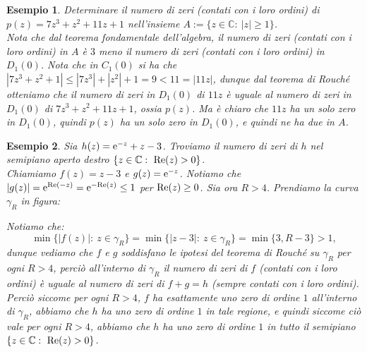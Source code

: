 \documentclass[11pt]{book}
\theoremstyle{Definizione}
\theoremstyle{TeoremaProposizioneLemmaCorollarioCongettura}
\theoremstyle{OsservazioneNotaEsempio}
\newtheorem{myes}{Esempio}[section]
\newcommand{\R}{\mathbb{R}}
\newcommand{\C}{\mathbb{C}}
\newcommand{\Disc}[3][]{D^{#1}_{{#2}}({#3})}
\renewcommand{\Re}{\textup{Re}}
\renewcommand{\i}{\textup{i}}
\newcommand{\e}{\textup{e}}
\newcommand{\frecciaIn}{
\tikz \draw[-latex] (-1pt,0) -- (1pt,0);
}
\newcommand{\frecciaOut}{
\tikz \draw[latex-] (-1pt,0) -- (1pt,0);
}
\begin{document}
\begin{myes}
Determinare il numero di zeri (contati con i loro ordini) di $p(z) = 7z^3+z^2+11z+1$ nell'insieme $A:=\{z\in \C:\ |z|\geq 1\}$.\\
Nota che dal teorema fondamentale dell'algebra, il numero di zeri (contati con i loro ordini) in $A$ è $3$ meno il numero di zeri (contati con i loro ordini) in $\Disc{1}{0}$. Nota che in $C_1(0)$ si ha che $|7z^3+z^2+1| \leq |7z^3|+|z^2|+1 = 9 < 11 = |11z|$, dunque dal teorema di Rouché otteniamo che il numero di zeri in $\Disc{1}{0}$ di $11z$ è uguale al numero di zeri in $\Disc{1}{0}$ di $7z^3+z^2+11z+1$, ossia $p(z)$. Ma è chiaro che $11z$ ha un solo zero in $\Disc{1}{0}$, quindi $p(z)$ ha un solo zero in $\Disc{1}{0}$, e quindi ne ha due in $A$.
\end{myes}
\begin{myes}
Sia $h(z) = \e^{-z}+z-3$. Troviamo il numero di zeri di $h$ nel semipiano aperto destro $\{z\in \C:\ \Re(z) > 0\}$.\\
Chiamiamo $f(z) = z-3$ e $g(z) = \e^{-z}$. Notiamo che $|g(z)| = \e^{\Re(-z)} = \e^{-\Re(z)} \leq 1$ per $\Re(z) \geq 0$. Sia ora $R > 4$. Prendiamo la curva $\gamma_R$ in figura:
\begin{center}
\end{center}
Notiamo che:
$$
\min\{|f(z)|:\ z\in \gamma_R\} = \min\{|z-3|:\ z\in \gamma_R\} = \min\{3,R-3\} > 1,
$$
dunque vediamo che $f$ e $g$ soddisfano le ipotesi del teorema di Rouché su $\gamma_R$ per ogni $R > 4$, perciò all'interno di $\gamma_R$ il numero di zeri di $f$ (contati con i loro ordini) è uguale al numero di zeri di $f+g = h$ (sempre contati con i loro ordini). Perciò siccome per ogni $R > 4$, $f$ ha esattamente uno zero di ordine $1$ all'interno di $\gamma_R$, abbiamo che $h$ ha uno zero di ordine $1$ in tale regione, e quindi siccome ciò vale per ogni $R > 4$, abbiamo che $h$ ha uno zero di ordine $1$ in tutto il semipiano $\{z\in \C:\ \Re(z)>0\}$.
\end{myes}
\end{document}
